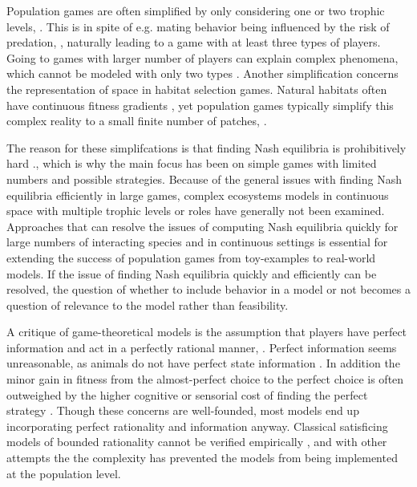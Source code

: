 Population games are often simplified by only considering  one or two trophic levels, \citep{kvrivan2007lotka, sadowski2019predator}. This is in spite of e.g. mating behavior being influenced by the risk of predation, \citep{carranza1999red,lima2009predators}, naturally leading to a game with at least three types of players. Going to games with larger number of players can explain complex phenomena, which cannot be modeled with only two types \citep{pinti2019trophic}. Another simplification concerns the representation of space in habitat selection games.  Natural habitats often have continuous fitness gradients \citep{kawecki2004conceptual}, yet population games typically simplify this complex reality to a small finite number of patches, \cite{valdovinos2010consequences}.

The reason for these simplifcations is that finding Nash equilibria is prohibitively hard \citep{empirical_trait,pinti2019trophic}., which is why the main focus has been on simple games with limited numbers and possible strategies. Because of the general issues with finding Nash equilibria efficiently in large games, complex ecosystems models in continuous space with multiple trophic levels or roles have generally not been examined. Approaches that can resolve the issues of computing Nash equilibria quickly for large numbers of interacting species and in continuous settings is essential for extending the success of population games from toy-examples to real-world models. If the issue of finding Nash equilibria quickly and efficiently can be resolved, the question of whether to include behavior in a model or not becomes a question of relevance to the model rather than feasibility.


A critique of game-theoretical models is the assumption that players have perfect information and act in a perfectly rational manner, \citep{jones1999bounded}. Perfect information seems unreasonable, as animals do not have perfect state information \citep{simon1955behavioral}. In addition the minor gain in fitness from the almost-perfect choice to the perfect choice is often outweighed by the higher cognitive or sensorial cost of finding the perfect strategy \citep{simon1956rational, cohen2019bounded}. Though these concerns are well-founded, most models end up incorporating perfect rationality and information anyway. Classical satisficing models of bounded rationality cannot be verified empirically \citep{nonacs1993satisficing}, and with other attempts the \citep{bayesianmodel, thuijsman1995automata} the complexity has prevented the models from being implemented at the population level.


